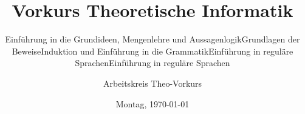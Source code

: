 %
%
%
%



\title{Vorkurs Theoretische Informatik}

\if{}
    \subtitle{Einführung in die Grundideen, Mengenlehre und Aussagenlogik}
    \newcommand\daynamestr{Montag}
\fi
\if{}
    \subtitle{Grundlagen der Beweise}
    \newcommand\daynamestr{Dienstag}
    \AdvanceDate
\fi
\if{}
    \subtitle{Induktion und Einführung in die Grammatik}
    \newcommand\daynamestr{Mittwoch}
    \AdvanceDate\AdvanceDate
\fi
\if{}
    \subtitle{Einführung in reguläre Sprachen}
    \newcommand\daynamestr{Donnerstag}
    \AdvanceDate\AdvanceDate\AdvanceDate
\fi
\if{}
    \subtitle{Einführung in reguläre Sprachen}
    \newcommand\daynamestr{Freitag}
    \AdvanceDate\AdvanceDate\AdvanceDate
\fi


\date{\daynamestr, \today}

\author{Arbeitskreis Theo-Vorkurs}

